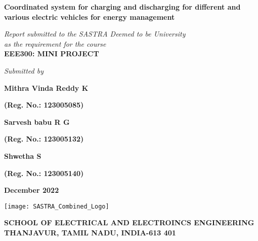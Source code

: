 \documentclass[a4paper, 12pt, oneside]{sastra}
\begin{document}
	
	
	\thispagestyle{empty}
	\begin{center}
		\Large{\textbf{Coordinated system for charging and discharging for different and various electric vehicles for energy management}}
	\end{center}
	\bigskip{}
	\bigskip{}
	\bigskip{}
	\begin{center}
		\textit{Report submitted to the SASTRA Deemed to be University\\ 
			as the requirement for the course\\
		}
		\bigskip{}
		\bigskip{}
		\large{\textbf{EEE300: MINI PROJECT}}
		\bigskip{}
		\bigskip{}
		\bigskip{}
		\bigskip{}
		\bigskip{}
		\bigskip{}
	\end{center}
	\begin{center}
		\textit{Submitted by}\\
	\end{center}
	\begin{center}
		\begin{singlespacing}
			\textbf{\Large{Mithra Vinda Reddy K}}
			
			\textbf{\large{(Reg. No.: 123005085)}}
			
			\textbf{\Large{Sarvesh babu R G}}
			
			\textbf{\large{(Reg. No.: 123005132)}}
			
			\textbf{\Large{Shwetha S}}
			
			\textbf{\large{(Reg. No.: 123005140)}}
		\end{singlespacing}
	\end{center}
	\bigskip{}
	
	\begin{center}
		\Large{\textbf{December 2022}}   %
	\end{center}
	\bigskip{}
	\begin{center}
		\texttt{[image: SASTRA\_Combined\_Logo]}
	\end{center}
	
	\begin{center}
		\large{\textbf{SCHOOL OF ELECTRICAL AND ELECTROINCS ENGINEERING}} %
		{\textbf{THANJAVUR, TAMIL NADU, INDIA-613 401}}
	\end{center}
	
\end{document}

